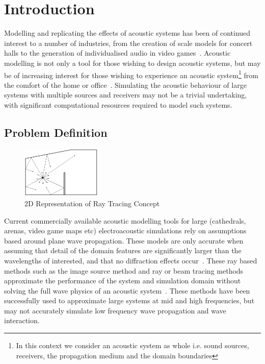 \chapter{Introduction}

Modelling and replicating the effects of acoustic systems has been of continued interest to a number of industries, from the creation of scale models for concert halls to the generation of individualised audio in video games~\cite{Rindel2000}. Acoustic modelling is not only a tool for those wishing to design acoustic systems, but may be of increasing interest for those wishing to experience an acoustic system\footnote{In this context we consider an acoustic system as whole i.e. sound sources, receivers, the propagation medium and the domain boundaries} from the comfort of the home or office~\cite{Tsingos2009}. Simulating the acoustic behaviour of large systems with multiple sources and receivers may not be a trivial undertaking, with significant computational resources required to model such systems. 

\section{Problem Definition}
\begin{figure}
  \includegraphics[width=0.34\textwidth]{./graphics/raytracing.png}
  \caption{2D Representation of Ray Tracing Concept~\cite{Elorza2005}}
\end{figure}

Current commercially available acoustic modelling tools for large (cathedrals, arenas, video game maps etc) electroacoustic simulations rely on assumptions based around plane wave propagation. These models are only accurate when assuming that detail of the domain features are significantly larger than the wavelengths of interested, and that no diffraction effects occur~\cite{Schmalle2011}. These ray based methods such as the image source method and ray or beam tracing methods approximate the performance of the system and simulation domain without solving the full wave physics of an acoustic system~\cite{Monks1996a}. These methods have been successfully used to approximate large systems at mid and high frequencies, but may not accurately simulate low frequency wave propagation and wave interaction.\\

